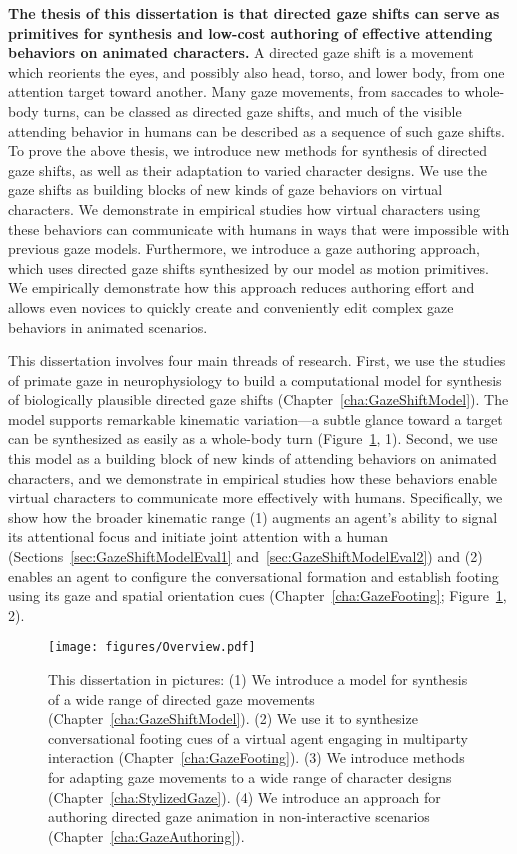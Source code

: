 \textbf{The thesis of this dissertation is that directed gaze shifts can serve as primitives for synthesis and low-cost authoring of effective attending behaviors on animated characters.}
A directed gaze shift is a movement which reorients the eyes, and possibly also head, torso, and lower body, from one attention target toward another. Many gaze movements, from saccades to whole-body turns, can be classed as directed gaze shifts, and much of the visible attending behavior in humans can be described as a sequence of such gaze shifts.
To prove the above thesis, we introduce new methods for synthesis of directed gaze shifts, as well as their adaptation to varied character designs. We use the gaze shifts as building blocks of new kinds of gaze behaviors on virtual characters. We demonstrate in empirical studies how virtual characters using these behaviors can communicate with humans in ways that were impossible with previous gaze models. Furthermore, we introduce a gaze authoring approach, which uses directed gaze shifts synthesized by our model as motion primitives. We empirically demonstrate how this approach reduces authoring effort and allows even novices to quickly create and conveniently edit complex gaze behaviors in animated scenarios.

This dissertation involves four main threads of research. First, we use the studies of primate gaze in neurophysiology to build a computational model for synthesis of biologically plausible directed gaze shifts (Chapter~\ref{cha:GazeShiftModel}). The model supports remarkable kinematic variation---a subtle glance toward a target can be synthesized as easily as a whole-body turn (Figure~\ref{fig:Overview}, 1).
Second, we use this model as a building block of new kinds of attending behaviors on animated characters, and we demonstrate in empirical studies how these behaviors enable virtual characters to communicate more effectively with humans.
Specifically, we show how the broader kinematic range (1) augments an agent's ability to signal its attentional focus and initiate joint attention with a human (Sections~\ref{sec:GazeShiftModelEval1} and~\ref{sec:GazeShiftModelEval2}) and (2) enables an agent to configure the conversational formation and establish footing using its gaze and spatial orientation cues (Chapter~\ref{cha:GazeFooting}; Figure~\ref{fig:Overview}, 2).

\begin{figure}
\centering
\texttt{[image: figures/Overview.pdf]}
\caption{This dissertation in pictures: (1) We introduce a model for synthesis of a wide range of directed gaze movements (Chapter~\ref{cha:GazeShiftModel}). (2) We use it to synthesize conversational footing cues of a virtual agent engaging in multiparty interaction (Chapter~\ref{cha:GazeFooting}). (3) We introduce methods for adapting gaze movements to a wide range of character designs (Chapter~\ref{cha:StylizedGaze}). (4) We introduce an approach for authoring directed gaze animation in non-interactive scenarios (Chapter~\ref{cha:GazeAuthoring}).}
\label{fig:Overview}
\end{figure}

